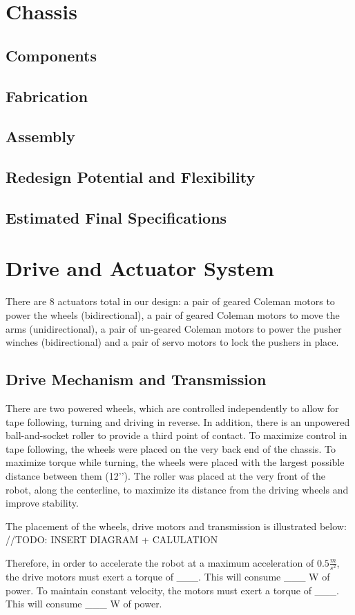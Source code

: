 \documentclass[12pt]{article}
\begin{document}
\section{Chassis}
\subsection{Components}
\subsection{Fabrication}
\subsection{Assembly}
\subsection{Redesign Potential and Flexibility}
\subsection{Estimated Final Specifications}

\section{Drive and Actuator System}
\par There are 8 actuators total in our design: a pair of geared Coleman motors to power the wheels (bidirectional), a pair of geared Coleman motors to move the arms (unidirectional), a pair of un-geared Coleman motors to power the pusher winches (bidirectional) and a pair of servo motors to lock the pushers in place. \\
\subsection{Drive Mechanism and Transmission}
\par There are two powered wheels, which are controlled independently to allow for tape following, turning and driving in reverse. In addition, there is an unpowered ball-and-socket roller to provide a third point of contact. To maximize control in tape following, the wheels were placed on the very back end of the chassis. To maximize torque while turning, the wheels were placed with the largest possible distance between them (12’’). The roller was placed at the very front of the robot, along the centerline, to maximize its distance from the driving wheels and improve stability. \\ \par 
The placement of the wheels, drive motors and transmission is illustrated below: \\
//TODO: INSERT DIAGRAM + CALULATION \\
\par Therefore, in order to accelerate the robot at a maximum acceleration of ${0.5 \frac{m}{s^2}}$, the drive motors must exert a torque of \_\_\_. This will consume \_\_\_ W of power. To maintain constant velocity, the motors must exert a torque of \_\_\_. This will consume \_\_\_ W of power. \\
\end{document}
